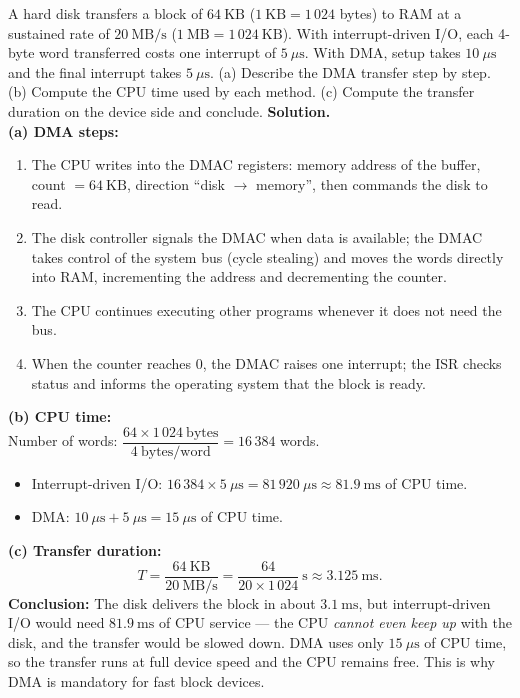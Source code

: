 \documentclass[11pt]{article}
\begin{document}
\begin{exoresolu}
A hard disk transfers a block of $64\ \mathrm{KB}$ ($1\ \mathrm{KB} = 1\,024$ bytes) to RAM at a sustained rate of $20\ \mathrm{MB/s}$ ($1\ \mathrm{MB} = 1\,024\ \mathrm{KB}$). With interrupt-driven I/O, each 4-byte word transferred costs one interrupt of $5\ \mu\mathrm{s}$. With DMA, setup takes $10\ \mu\mathrm{s}$ and the final interrupt takes $5\ \mu\mathrm{s}$. (a) Describe the DMA transfer step by step. (b) Compute the CPU time used by each method. (c) Compute the transfer duration on the device side and conclude.
\tcblower
\textbf{Solution.}\\
\textbf{(a) DMA steps:}
\begin{enumerate}
\item The CPU writes into the DMAC registers: memory address of the buffer, count $= 64\ \mathrm{KB}$, direction ``disk $\rightarrow$ memory'', then commands the disk to read.
\item The disk controller signals the DMAC when data is available; the DMAC takes control of the system bus (cycle stealing) and moves the words directly into RAM, incrementing the address and decrementing the counter.
\item The CPU continues executing other programs whenever it does not need the bus.
\item When the counter reaches 0, the DMAC raises one interrupt; the ISR checks status and informs the operating system that the block is ready.
\end{enumerate}
\textbf{(b) CPU time:}\\
Number of words: $\dfrac{64\times 1\,024\ \text{bytes}}{4\ \text{bytes/word}} = 16\,384$ words.
\begin{itemize}
\item Interrupt-driven I/O: $16\,384 \times 5\ \mu\mathrm{s} = 81\,920\ \mu\mathrm{s} \approx 81.9\ \mathrm{ms}$ of CPU time.
\item DMA: $10\ \mu\mathrm{s} + 5\ \mu\mathrm{s} = 15\ \mu\mathrm{s}$ of CPU time.
\end{itemize}
\textbf{(c) Transfer duration:}
\[
T = \frac{64\ \mathrm{KB}}{20\ \mathrm{MB/s}} = \frac{64}{20\times 1\,024}\ \mathrm{s} \approx 3.125\ \mathrm{ms}.
\]
\textbf{Conclusion:} The disk delivers the block in about $3.1\ \mathrm{ms}$, but interrupt-driven I/O would need $81.9\ \mathrm{ms}$ of CPU service --- the CPU \emph{cannot even keep up} with the disk, and the transfer would be slowed down. DMA uses only $15\ \mu\mathrm{s}$ of CPU time, so the transfer runs at full device speed and the CPU remains free. This is why DMA is mandatory for fast block devices.
\end{exoresolu}
\end{document}
